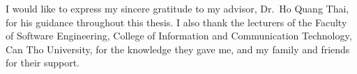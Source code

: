 \noindent\hspace{\parindent}I would like to express my sincere gratitude to my advisor, Dr.\ Ho Quang Thai,
for his guidance throughout this thesis. I also thank the lecturers of the Faculty of Software Engineering,
College of Information and Communication Technology, Can Tho University, for the knowledge they gave me,
and my family and friends for their support.
